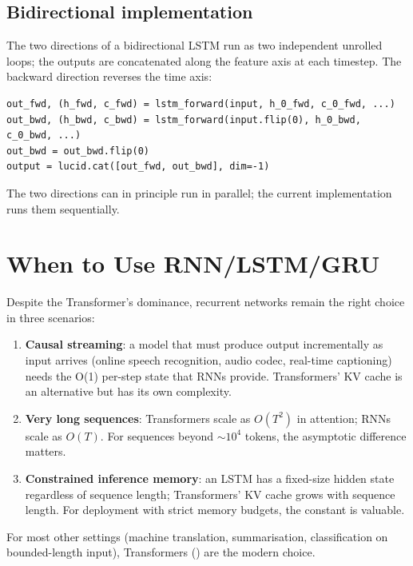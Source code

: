 \subsection{Bidirectional implementation}
\label{ssec:rnn_family:bidir_impl}

The two directions of a bidirectional LSTM run as two
independent unrolled loops; the outputs are concatenated along
the feature axis at each timestep. The backward direction
reverses the time axis:

\begin{lstlisting}[style=lucid,language=LucidPython]
out_fwd, (h_fwd, c_fwd) = lstm_forward(input, h_0_fwd, c_0_fwd, ...)
out_bwd, (h_bwd, c_bwd) = lstm_forward(input.flip(0), h_0_bwd, c_0_bwd, ...)
out_bwd = out_bwd.flip(0)
output = lucid.cat([out_fwd, out_bwd], dim=-1)
\end{lstlisting}

The two directions can in principle run in parallel; the
current implementation runs them sequentially.

\section{When to Use RNN/LSTM/GRU}
\label{sec:rnn_family:when_to_use}

Despite the Transformer's dominance, recurrent networks remain
the right choice in three scenarios:

\begin{enumerate}
  \item \textbf{Causal streaming}: a model that must produce
    output incrementally as input arrives (online speech
    recognition, audio codec, real-time captioning) needs the
    O(1) per-step state that RNNs provide. Transformers' KV cache
    is an alternative but has its own complexity.
  \item \textbf{Very long sequences}: Transformers scale as
    $O(T^2)$ in attention; RNNs scale as $O(T)$. For sequences
    beyond $\sim 10^4$ tokens, the asymptotic difference matters.
  \item \textbf{Constrained inference memory}: an LSTM has a
    fixed-size hidden state regardless of sequence length;
    Transformers' KV cache grows with sequence length. For
    deployment with strict memory budgets, the constant is
    valuable.
\end{enumerate}

For most other settings (machine translation, summarisation,
classification on bounded-length input), Transformers
() are the modern choice.

